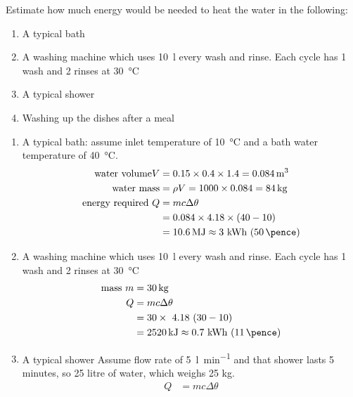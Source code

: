\documentclass{article} %
\begin{document}
\begin{question}\label{qu:ex1}
Estimate how much energy would be needed to heat the water in the following:
    \begin{enumerate}[label=\alph*)]
        \item A typical bath
        \item A washing machine which uses \SI{10}{\litre} every wash and rinse. Each cycle has 1 wash and 2 rinses at \SI{30}{\celsius} 
        \item A typical shower
        \item Washing up the dishes after a meal
    \end{enumerate}
\end{question} 
\begin{solution}\label{sol:ex1}
    \begin{enumerate}[label=\alph*)]
        \item A typical bath: assume inlet temperature of \SI{10}{\celsius} and a bath water temperature of \SI{40}{\celsius}.
            \begin{align*}
            \text{water\ volume} V&=0.15\times 0.4\times 1.4 = \SI{0.084}{\metre\cubed}\\
            \text{water\ mass}&=\rho V=1000\times 0.084=\SI{84}{\kg}\\
            \text{energy\ required } Q &=mc\Delta\theta\\
            &=0.084\times 4.18\times (40-10)\\
            &=\SI{10.6}{\mega\joule}\approx 3\ \text{kWh} \ (\SI{50}{\pence})
            \end{align*}
        \item A washing machine which uses \SI{10}{\litre} every wash and rinse. Each cycle has 1 wash and 2 rinses at \SI{30}{\celsius}
            \begin{align*}
            \text{mass}\ m &=\SI{30}{\kg}\\
            Q &=mc\Delta\theta\\
            &=30\times\ 4.18\ (30-10)\\
            &=\SI{2520}{\kilo\joule}\approx 0.7\ \text{kWh} \ (\SI{11}{\pence})
            \end{align*}
        \item A typical shower
            Assume flow rate of \SI{5}{\litre\per\minute} and that shower lasts 5 minutes, so 25 litre of water, which weighs 25 kg.
            \begin{align*}
            Q &=mc\Delta\theta\\

\end{align*}
\end{enumerate}
\end{solution}
\end{document}
